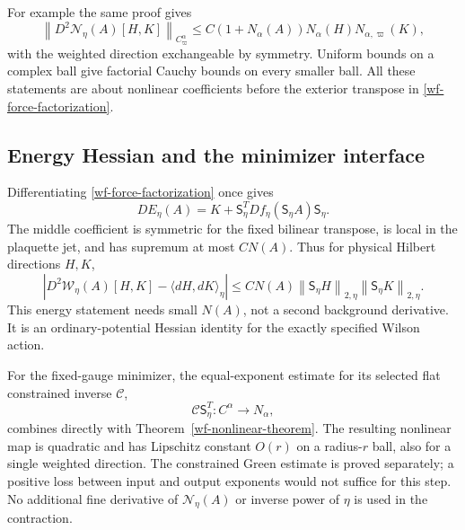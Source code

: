 \documentclass[11pt]{article}
\theoremstyle{remark}
\newcommand{\norm}[1]{\left\|#1\right\|}
\begin{document}
For example the same proof gives
\begin{equation}\label{wf-second-directional}
 \norm{D^2\mathcal N_\eta(A)[H,K]}_{C^\alpha_\varpi}
 \le C(1+N_\alpha(A))N_\alpha(H)N_{\alpha,\varpi}(K),
\end{equation}
with the weighted direction exchangeable by symmetry.
Uniform bounds on a complex ball give factorial Cauchy
bounds on every smaller ball. All these statements are
about nonlinear coefficients before the exterior
transpose in \eqref{wf-force-factorization}.

\subsection{Energy Hessian and the minimizer interface}

Differentiating \eqref{wf-force-factorization} once gives
\begin{equation}\label{wf-energy-Hessian}
 DE_\eta(A)=K+\mathsf S_\eta^T
                Df_\eta(\mathsf S_\eta A)\mathsf S_\eta.
\end{equation}
The middle coefficient is symmetric for the fixed bilinear
transpose, is local in the plaquette jet, and has supremum
at most $CN(A)$. Thus for physical Hilbert directions $H,K$,
\begin{equation}\label{wf-energy-form}
 \left|D^2\mathcal W_\eta(A)[H,K]
                         -\langle dH,dK\rangle_\eta\right|
 \le CN(A)\norm{\mathsf S_\eta H}_{2,\eta}
                         \norm{\mathsf S_\eta K}_{2,\eta}.
\end{equation}
This energy statement needs small $N(A)$, not a second
background derivative. It is an ordinary-potential
Hessian identity for the exactly specified Wilson action.

For the fixed-gauge minimizer, the equal-exponent estimate
for its selected flat constrained inverse $\mathcal C$,
\[
 \mathcal C\mathsf S_\eta^T:C^\alpha\longrightarrow N_\alpha,
\]
combines directly with Theorem~\ref{wf-nonlinear-theorem}.
The resulting nonlinear map is quadratic and has
Lipschitz constant $O(r)$ on a radius-$r$ ball, also for
a single weighted direction. The constrained Green estimate
is proved separately; a positive loss between input and
output exponents would not suffice for this step. No
additional fine derivative of $\mathcal N_\eta(A)$ or
inverse power of $\eta$ is used in the contraction.
\end{document}
